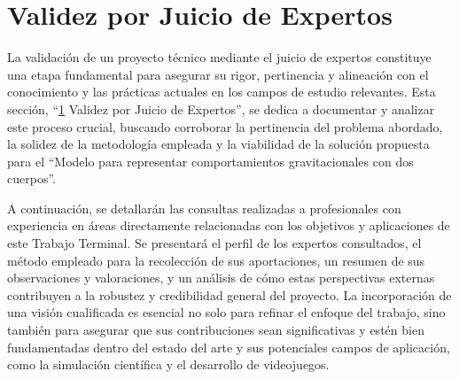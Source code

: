 \section{Validez por Juicio de Expertos}%
\label{sec:analisis_expertos}

La validación de un proyecto técnico mediante el juicio de expertos constituye una etapa fundamental para asegurar su rigor, pertinencia y alineación con el conocimiento y las prácticas actuales en los campos de estudio relevantes. Esta sección, ``\ref{sec:analisis_expertos} Validez por Juicio de Expertos'', se dedica a documentar y analizar este proceso crucial, buscando corroborar la pertinencia del problema abordado, la solidez de la metodología empleada y la viabilidad de la solución propuesta para el ``Modelo para representar comportamientos gravitacionales con dos cuerpos''.

A continuación, se detallarán las consultas realizadas a profesionales con experiencia en áreas directamente relacionadas con los objetivos y aplicaciones de este Trabajo Terminal. Se presentará el perfil de los expertos consultados, el método empleado para la recolección de sus aportaciones, un resumen de sus observaciones y valoraciones, y un análisis de cómo estas perspectivas externas contribuyen a la robustez y credibilidad general del proyecto. La incorporación de una visión cualificada es esencial no solo para refinar el enfoque del trabajo, sino también para asegurar que sus contribuciones sean significativas y estén bien fundamentadas dentro del estado del arte y sus potenciales campos de aplicación, como la simulación científica y el desarrollo de videojuegos.

